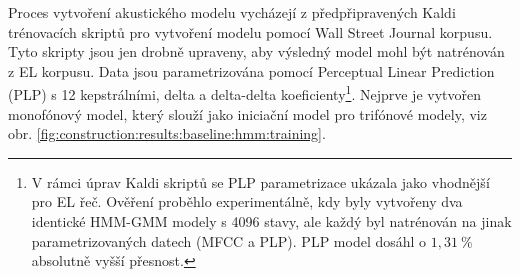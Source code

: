 


Proces vytvoření akustického modelu vycházejí z předpřipravených Kaldi trénovacích skriptů pro vytvoření modelu pomocí Wall Street Journal korpusu. Tyto skripty jsou jen drobně upraveny, aby výsledný model mohl být natrénován z EL korpusu. Data jsou parametrizována pomocí Perceptual Linear Prediction (PLP) s 12 kepstrálními, delta a delta-delta koeficienty\footnote{V rámci úprav Kaldi skriptů se PLP parametrizace ukázala jako vhodnější pro EL řeč. Ověření proběhlo experimentálně, kdy byly vytvořeny dva identické HMM-GMM modely s 4096 stavy, ale každý byl natrénován na jinak parametrizovaných datech (MFCC a PLP). PLP model dosáhl o $1,31\ \%$ absolutně vyšší přesnost.}. Nejprve je vytvořen monofónový model, který slouží jako iniciační model pro trifónové  modely, viz obr. \ref{fig:construction:results:baseline:hmm:training}.


